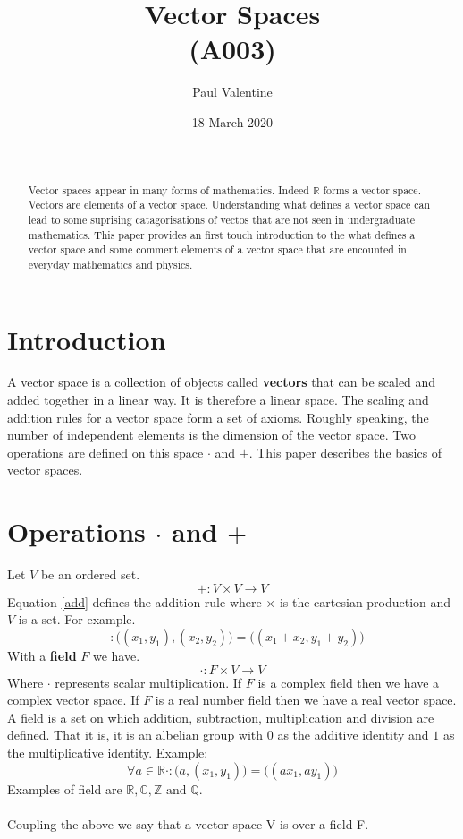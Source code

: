 \documentclass[a4paper]{article}
\title{\textbf{Vector Spaces}\\(A003)}
\author{Paul Valentine}
\date{18 March 2020}
\begin{document}
\maketitle
\begin{abstract}
  \\\ \\Vector spaces appear in many forms of mathematics. Indeed $\mathbb{R}$ forms a vector space. Vectors are elements of a vector space. Understanding what defines a vector space can lead to some suprising catagorisations of vectos that are not seen in undergraduate mathematics. This paper provides an first touch introduction to the what defines a vector space and some comment elements of a vector space that are encounted in everyday mathematics and physics.
\end{abstract}
\section{Introduction}
A vector space is a collection of objects called \textbf{vectors} that can be scaled and added together in a linear way. It is therefore a linear space. The scaling and addition rules for a vector space form a set of axioms. Roughly speaking, the number of independent elements is the dimension of the vector space. Two operations are defined on this space $\cdot$ and $+$. This paper describes the basics of vector spaces.
\section{Operations $\cdot$ and $+$}
Let $V$ be an ordered set.
\label{operations}
\begin{equation}
  \label{add}
  +:V \times V \to V
\end{equation}
Equation \ref{add} defines the addition rule where $\times$ is the cartesian production\cite{A002} and $V$ is a set. For example.
\begin{equation}
  +:\big((x_1, y_1),(x_2,y_2)\big) = \big((x_1+x_2,y_1+y_2)\big)
\end{equation}
 With a \textbf{field}\cite{wiki:mathfield} $F$ we have.
\begin{equation}
  \cdot : F \times V \to V
\end{equation}
Where $\cdot$ represents scalar multiplication. If $F$ is a complex field then we have a complex vector space. If $F$ is a real number field then we have a real vector space. A field is a set on which addition, subtraction, multiplication and division are defined. That it is, it is an albelian group with $0$ as the additive identity and $1$ as the multiplicative identity. Example:
\begin{equation}
\forall a\in \mathbb{R}  \cdot:\big(a,(x_1,y_1)\big) = \big((ax_1,ay_1)\big)
\end{equation}
Examples of field are $\mathbb{R}, \mathbb{C}, \mathbb{Z} \text{ and } \mathbb{Q}$.\\ \\
Coupling the above we say that a vector space V is over a field F.
\end{document}
